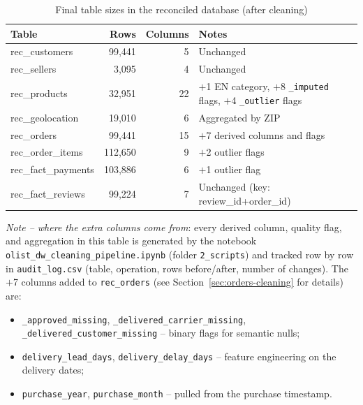 \documentclass[12pt,a4paper]{article}
\begin{document}
\begin{table}[H]
  \centering
  \caption{Final table sizes in the reconciled database (after cleaning)}
  \label{tab:final}
  \begin{tabular}{lrrl}
    \toprule
    \textbf{Table} & \textbf{Rows} & \textbf{Columns} & \textbf{Notes} \\
    \midrule
    rec\_customers    &  99,441 &  5 & Unchanged \\
    rec\_sellers      &   3,095 &  4 & Unchanged \\
    rec\_products     &  32,951 & 22 & $+$1 EN category, $+$8 \texttt{\_imputed} flags, $+$4 \texttt{\_outlier} flags \\
    rec\_geolocation  &  19,010 &  6 & Aggregated by ZIP \\
    rec\_orders       &  99,441 & 15 & $+$7 derived columns and flags \\
    rec\_order\_items & 112,650 &  9 & $+$2 outlier flags \\
    rec\_fact\_payments & 103,886 &  6 & $+$1 outlier flag \\
    rec\_fact\_reviews  &  99,224 &  7 & Unchanged (key: review\_id+order\_id) \\
    \bottomrule
  \end{tabular}
\end{table}

\begin{sloppypar}
\textit{Note -- where the extra columns come from}: every derived column, quality
flag, and aggregation in this table is generated by the notebook
\texttt{olist\_dw\_cleaning\_pipeline.ipynb} (folder \texttt{2\_scripts}) and
tracked row by row in \texttt{audit\_log.csv} (table, operation, rows before/after,
number of changes). The $+$7 columns added to \texttt{rec\_orders} (see
Section~\ref{sec:orders-cleaning} for details) are:
\end{sloppypar}

\begin{itemize}
\sloppy
  \item \texttt{\_approved\_missing}, \texttt{\_delivered\_carrier\_missing},
        \texttt{\_delivered\_customer\_missing} -- binary flags for semantic nulls;
  \item \texttt{delivery\_lead\_days}, \texttt{delivery\_delay\_days} -- feature
        engineering on the delivery dates;
  \item \texttt{purchase\_year}, \texttt{purchase\_month} -- pulled from the
        purchase timestamp.
\end{itemize}
\end{document}
